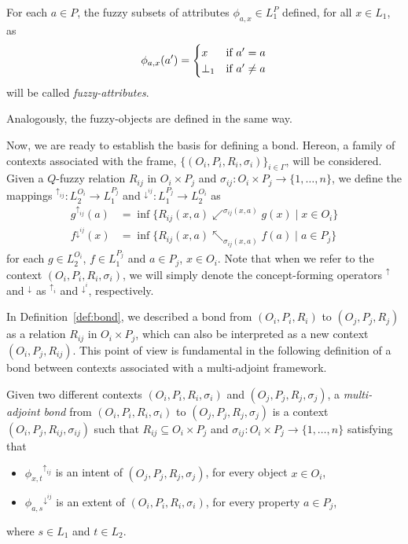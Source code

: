 \documentclass[runningheads,a4paper]{llncs}
\newcommand{\up}[1][]{{^{\uparrow_{#1}}}}
\newcommand{\down}[1][]{{^{\downarrow^{#1}}}}
\begin{document}
\begin{definition}\label{fuzzy-attribute}

For each $a\in P$, the fuzzy subsets of attributes $\phi_{a,x}\in L_1^P$ defined, for all $x\in L_1$, as
$$ \phi_{a,x}(a') = \begin{cases}
 x& \hbox{if } a' = a\\
 \bot_1 &\hbox{if } a'\neq a
\end{cases}
$$
will be called \emph{fuzzy-attributes}.

\end{definition}

Analogously, the fuzzy-objects are defined in the same way.

Now, we are ready to establish the basis for defining a bond. Hereon, a family of contexts associated with the frame, $\{(O_i, P_i, R_i, \sigma_i)\}_{i \in \Gamma}$, will be considered. Given a $Q$-fuzzy relation $R_{ij}$ in $O_i \times P_j$ and $\sigma_{ij} \colon O_i \times P_j \to \{1, \dots, n\}$, we define the mappings $\up[ij] \colon L_2^{O_i} \to L_1^{P_j}$ and $\down[ij] \colon L_1^{P_j} \to L_2^{O_i}$ as
\begin{align*}
	g\up[ij](a) &= \inf \{R_{ij}(x, a) \swarrow^{\sigma_{ij}(x,a)} g(x) \mid x \in O_i\} \\
	f\down[ij](x) &= \inf \{R_{ij}(x, a) \nwarrow_{\sigma_{ij}(x,a)} f(a) \mid a \in P_j\}
\end{align*}
for each $g \in L_2^{O_i}$, $f \in L_1^{P_j}$ and $a \in P_j$, $x \in O_i$. Note that when we refer to the context $(O_i, P_i, R_i, \sigma_i)$, we will simply denote the concept-forming operators $\up$ and $\down$ as $\up[i]$ and $\down[i]$, respectively.

In Definition~\ref{def:bond}, we described a bond from $(O_i, P_i, R_i)$ to $(O_j, P_j, R_j)$ as a relation $R_{ij}$ in $O_i \times P_j$, which can also be interpreted as a new context $(O_i, P_j, R_{ij})$. This point of view is fundamental in the following definition of a bond between contexts associated with a multi-adjoint framework.

\begin{definition}
	
Given two different contexts $(O_i, P_i, R_i, \sigma_i)$ and $(O_j, P_j, R_j, \sigma_j)$, a \emph{multi-adjoint bond} from $(O_i, P_i, R_i, \sigma_i)$ to $(O_j, P_j, R_j, \sigma_j)$ is a context\\ $(O_i, P_j, R_{ij}, \sigma_{ij})$ such that $R_{ij} \subseteq O_i \times P_j$ and $\sigma_{ij} \colon O_i \times P_j \to \{1, \dots, n\}$ satisfying that
\begin{itemize}
	\item $\phi_{x,t}\up[ij]$ is an intent of $(O_j, P_j, R_j, \sigma_j)$, for every object $x \in O_i$,\\[-5pt]
	\item $\phi_{a,s}\down[ij]$ is an extent of $(O_i, P_i, R_i, \sigma_i)$, for every property $a \in P_j$,
\end{itemize}
where $s \in L_1$ and $t \in L_2$.

\end{definition}
\end{document}
